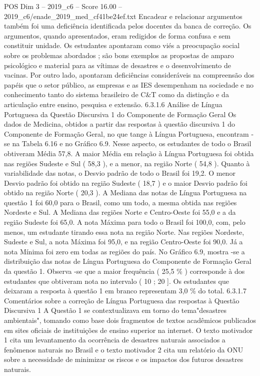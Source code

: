 \begin{textsample}{POS Dim 3 – 2019\_c6 – Score 16.00 – 2019\_c6/enade\_2019\_med\_cf41be24ef.txt}
Encadear e relacionar argumentos também foi uma deficiência identificada pelos docentes da banca de correção.
Os argumentos, quando apresentados, eram redigidos de forma confusa e sem constituir unidade.
Os estudantes apontaram como viés a preocupação social sobre os problemas abordados ; são bons exemplos as propostas de amparo psicológico e material para as vítimas de desastres e o desenvolvimento de vacinas.
Por outro lado, apontaram deficiências consideráveis na compreensão dos papéis que o setor público, as empresas e as IES desempenham na sociedade e no conhecimento tanto do sistema brasileiro de C\&T como da distinção e da articulação entre ensino, pesquisa e extensão. 6.3.1.6 Análise de Língua Portuguesa da Questão Discursiva 1 do Componente de Formação Geral Os dados de Medicina, obtidos a partir das respostas à questão discursiva 1 do Componente de Formação Geral, no que tange à Língua Portuguesa, encontram -se na Tabela 6.16 e no Gráfico 6.9.
Nesse aspecto, os estudantes de todo o Brasil obtiveram Média 57,8.
A maior Média em relação à Língua Portuguesa foi obtida nas regiões Sudeste e Sul ( 58,3 ), e a menor, na região Norte ( 54,8 ).
Quanto à variabilidade das notas, o Desvio padrão de todo o Brasil foi 19,2.
O menor Desvio padrão foi obtido na região Sudeste ( 18,7 ) e o maior Desvio padrão foi obtido na região Norte ( 20,3 ).
A Mediana das notas de Língua Portuguesa na questão 1 foi 60,0 para o Brasil, como um todo, a mesma obtida nas regiões Nordeste e Sul.
A Mediana das regiões Norte e Centro-Oeste foi 55,0 e a da região Sudeste foi 65,0.
A nota Máxima para todo o Brasil foi 100,0, com, pelo menos, um estudante tirando essa nota na região Norte.
Nas regiões Nordeste, Sudeste e Sul, a nota Máxima foi 95,0, e na região Centro-Oeste foi 90,0.
Já a nota Mínima foi zero em todas as regiões do país.
No Gráfico 6.9, mostra -se a distribuição das notas de Língua Portuguesa do Componente de Formação Geral da questão 1.
Observa -se que a maior frequência ( 25,5 \% ) corresponde à dos estudantes que obtiveram nota no intervalo ( 10 ; 20 ].
Os estudantes que deixaram a resposta à questão 1 em branco representam 3,0 \% do total. 6.3.1.7 Comentários sobre a correção de Língua Portuguesa das respostas à Questão Discursiva 1 A Questão 1 se contextualizava em torno do tema"desastres ambientais", tomando como base dois fragmentos de textos acadêmicos publicados em sites oficiais de instituições de ensino superior na internet.
O texto motivador 1 cita um levantamento da ocorrência de desastres naturais associados a fenômenos naturais no Brasil e o texto motivador 2 cita um relatório da ONU sobre a necessidade de minimizar os riscos e os impactos dos futuros desastres naturais.

\end{textsample}
